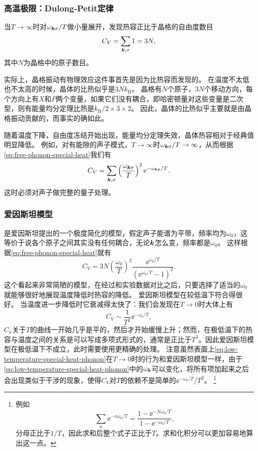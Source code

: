 \subsubsection{高温极限：Dulong-Petit定律} 

当$T \to \infty$时对$\omega_{\vb*{k} \sigma} / T$做小量展开，发现热容正比于晶格的自由度数目
\begin{equation}
    C_V = \sum_{\vb*{k}, \sigma} 1 = 3 N ,
\end{equation}
其中$N$为晶格中的原子数目。

实际上，晶格振动有物理效应这件事首先是因为比热容而发现的。
在温度不太低也不太高的时候，晶体的比热似乎是$3 N k_\text{B}$。
晶格有$N$个原子，$3N$个移动方向，每个方向上有$X$和$P$两个变量，如果它们没有耦合，即哈密顿量对这些变量是二次型，则有能量均分定理比热是$k_\text{B}/2 \times 3 \times 2$。
因此，晶体的比热似乎主要就是由晶格振动贡献的，而事实的确如此。

随着温度下降，自由度冻结开始出现，能量均分定理失效，晶体热容相对于经典值明显降低。
例如，对有能隙的声子模式，$T \to \infty$时$\omega_{\vb*{k} \sigma} / T \to \infty$，从而根据\eqref{eq:free-phonon-special-heat}我们有
\begin{equation}
    C_V = \sum_{\vb*{k}, \sigma} \left(\frac{\omega_{\vb*{k}\sigma}}{T}\right)^2 \mathrm{e}^{-\omega_{\vb*{k}\sigma} / T}.
    \label{eq:low-temperature-special-heat-phonon}
\end{equation}
这时必须对声子做完整的量子处理。

\subsubsection{爱因斯坦模型} 

是爱因斯坦提出的一个极度简化的模型，假定声子能谱为平带，频率均为$\omega_0$，这等价于说各个原子之间其实没有任何耦合，无论$\vb*{k}$怎么变，频率都是$\omega_0$。
这样根据\eqref{eq:free-phonon-special-heat}就有
\begin{equation}
    C_V = 3 N \left(\frac{\omega_0}{T}\right)^2 \frac{\ee^{\omega_0 / T}}{(\ee^{\omega_0 / T} - 1)^2}.
\end{equation}
这个看起来非常简陋的模型，在经过和实验数据对比之后，只要选择了适当的$\omega_0$就能够很好地展现温度降低时热容的降低。
爱因斯坦模型在较低温下符合得很好。
当温度进一步降低时它衰减得太快了：我们会发现在$T \to 0$时大体上有
\[
    C_V \sim \frac{1}{T^2} \ee^{- \omega_0 / T},
\]
$C_V$关于$T$的曲线一开始几乎是平的，然后才开始缓慢上升；然而，在极低温下的热容与温度之间的关系是可以写成多项式形式的，通常是正比于$T^3$。因此爱因斯坦模型在极低温下不成立，此时需要使用更精确的处理。
注意虽然表面上\eqref{eq:low-temperature-special-heat-phonon}在$T \to 0$时的行为和爱因斯坦模型一样，由于\eqref{eq:low-temperature-special-heat-phonon}中的$\omega_{\vb*{k}}$可以变化，将所有项加起来之后会出现类似于干涉的现象，使得$C_V$对$T$的依赖不是简单的$\ee^{- \omega_0 / T} / T^2$。%
\footnote{
    例如
    \[
        \sum_n \ee^{- n \omega_0 / T} = \frac{1 - \ee^{- N \omega_0 / T}}{1 - \ee^{- \omega_0 / T}},
    \]
    分母正比于$1/T$，因此求和后整个式子正比于$T$。求和化积分可以更加容易地算出这一点。
}%

